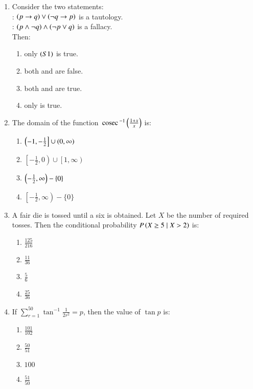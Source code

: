 \documentclass[journal,9pt,onecolumn]{IEEEtran}
\begin{document}
\begin{enumerate}
\item Consider the two statements:\\
     : $\left(p \rightarrow q\right) \lor \left(\neg q \rightarrow p\right)$ is a tautology.\\
     : $\left(p \land \neg q\right) \land \left(\neg p \lor q\right)$ is a fallacy.\\
Then:
\begin{multicols}{2}    
\begin{enumerate}
    \item only $\left(S1\right)$ is true.
    \item both  and  are false.
    \item both  and  are true.
    \item only  is true.
\end{enumerate}
\end{multicols}


\item  The domain of the function $ \,\text{cosec}\,^{-1} \left( \frac{1 + x}{x}\right) $ is:
\begin{multicols}{4}    
\begin{enumerate}
    \item $\left( -1, -\frac{1}{2} \right] \cup \left(0, \infty\right)$
    \item $\left[-\frac{1}{2}, 0\right) \cup \left[1, \infty\right)$
    \item $\left(-\frac{1}{2}, \infty \right) - \{0\}$
    \item $\left[ -\frac{1}{2}, \infty \right) - \{0\}$
\end{enumerate}
\end{multicols}


\item A fair die is tossed until a six is obtained. Let $X$ be the number of required tosses. Then the conditional probability $P\left(X \geq 5 \mid X > 2\right)$ is:
\begin{multicols}{4}
\begin{enumerate}
    \item $\frac{125}{216}$
    \item $\frac{11}{36}$
    \item $\frac{5}{6}$
    \item $\frac{25}{36}$
\end{enumerate}
\end{multicols}


\item If $\sum_{r=1}^{50} \tan^{-1} \frac{1}{2r^2} = p$, then the value of $\tan p$ is:
\begin{multicols}{4}    
\begin{enumerate}
    \item $\frac{101}{102}$
    \item $\frac{50}{51}$
    \item $100$
    \item $\frac{51}{50}$
\end{enumerate}
\end{multicols}



\end{enumerate}
\end{document}
